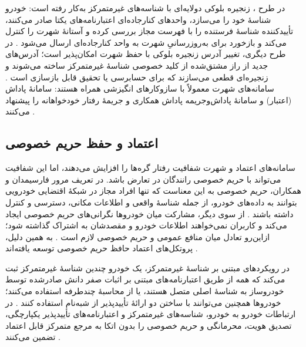 \documentclass[12pt,a4paper]{article}
\begin{document}
در طرح ، زنجیره بلوکی دولایه‌ای با شناسه‌های غیرمتمرکز به‌کار رفته است: خودرو شناسهٔ خود را می‌سازد، واحد‌های کنارجاده‌ای اعتبارنامه‌های یکتا صادر می‌کنند، تأییدکننده شناسهٔ فرستنده را با فهرست مجاز بررسی کرده و آستانهٔ شهرت را کنترل می‌کند و بازخورد برای به‌روزرسانیِ شهرت به واحد کنارجاده‌ای ارسال می‌شود \cite{mazzocca2025survey}. در طرح دیگری، تغییر آدرس زنجیره بلوکی با حفظ شهرت امکان‌پذیر است؛ آدرس‌های جدید از راز مشتق‌شده از کلید خصوصی شناسهٔ غیرمتمرکز ساخته می‌شوند و زنجیره‌ای قطعی می‌سازند که برای حسابرسی یا تحقیق قابل بازسازی است \cite{mazzocca2025survey}. سامانه‌های شهرت معمولاً با سازوکار‌های انگیزشی همراه هستند: سامانهٔ پاداش (اعتبار) و سامانهٔ پاداش‌و‌جریمه پاداش همکاری و جریمهٔ رفتار خودخواهانه را پیشنهاد می‌کنند \cite{farsimadanReviewSecurityChallenges2025}.

\subsection{اعتماد و حفظ حریم خصوصی}

سامانه‌های اعتماد و شهرت شفافیت رفتار گره‌ها را افزایش می‌دهند، اما این شفافیت می‌تواند با حریم خصوصی رانندگان در تعارض باشد. در تعریف مرور فارسیمدان و همکاران، حریم خصوصی به این معناست که تنها افراد مجاز در شبکهٔ اقتضایی خودرویی بتوانند به داده‌های خودرو، از جمله شناسهٔ واقعی و اطلاعات مکانی، دسترسی و کنترل داشته باشند \cite{farsimadanReviewSecurityChallenges2025}. از سوی دیگر، مشارکت میان خودرو‌ها نگرانی‌های حریم خصوصی ایجاد می‌کند \cite{farsimadanReviewSecurityChallenges2025} و کاربران نمی‌خواهند اطلاعات خودرو و مقصدشان به اشتراک گذاشته شود؛ ازاین‌رو تعادل میان منافع عمومی و حریم خصوصی لازم است \cite{hozouriOverviewVANETVehicular2023}. به همین دلیل، پروتکل‌های اعتماد حافظ حریم خصوصی توسعه یافته‌اند \cite{farsimadanReviewSecurityChallenges2025}.

در رویکرد‌های مبتنی بر شناسهٔ غیرمتمرکز، یک خودرو چندین شناسهٔ غیرمتمرکز ثبت می‌کند که همه از طریق اعتبارنامه‌های مبتنی بر اثبات صفر دانش صادرشده توسط خودروساز به شناسهٔ اصلی متصل هستند، یا از محاسبهٔ چندطرفه استفاده می‌کنند؛ خودرو‌ها همچنین می‌توانند با ساختن دو ارائهٔ تأییدپذیر از شبه‌نام استفاده کنند \cite{mazzocca2025survey}. در ارتباطات خودرو به خودرو، شناسه‌های غیرمتمرکز و اعتبارنامه‌های تأییدپذیر یکپارچگی، تصدیق هویت، محرمانگی و حریم خصوصی را بدون اتکا به مرجع متمرکز قابل اعتماد تضمین می‌کنند \cite{mazzocca2025survey}.
\end{document}
